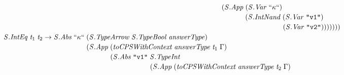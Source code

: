 \documentclass[10pt]{article}
\newcommand{\Conid}[1]{\mathit{#1}}
\newcommand{\Varid}[1]{\mathit{#1}}
\begin{document}
\begin{hscode}
${\hskip1.00em\relax\hskip1.00em\relax\phantom{\Conid{\Conid{S}.IntNand}\;\Varid{t}_{1}\;\Varid{t}_{2}\to \Conid{\Conid{S}.Abs}\;\text{``}\kappa\text{``}\;\mbox{}}\phantom{(\Conid{\Conid{S}.App}\;\mbox{}}\phantom{(\Conid{\Conid{S}.Abs}\;\text{\tt \char34 v1\char34}\;\mbox{}}\phantom{(\Conid{\Conid{S}.App}\;\mbox{}}\phantom{(\Conid{\Conid{S}.Abs}\;\text{\tt \char34 v2\char34}\;\mbox{}}(\Conid{\Conid{S}.App}\;(\Conid{\Conid{S}.Var}\;\text{``}\kappa\text{``})\;}$\\
${\hskip1.00em\relax\hskip1.00em\relax\phantom{\Conid{\Conid{S}.IntNand}\;\Varid{t}_{1}\;\Varid{t}_{2}\to \Conid{\Conid{S}.Abs}\;\text{``}\kappa\text{``}\;\mbox{}}\phantom{(\Conid{\Conid{S}.App}\;\mbox{}}\phantom{(\Conid{\Conid{S}.Abs}\;\text{\tt \char34 v1\char34}\;\mbox{}}\phantom{(\Conid{\Conid{S}.App}\;\mbox{}}\phantom{(\Conid{\Conid{S}.Abs}\;\text{\tt \char34 v2\char34}\;\mbox{}}\phantom{(\Conid{\Conid{S}.App}\;\mbox{}}(\Conid{\Conid{S}.IntNand}\;(\Conid{\Conid{S}.Var}\;\text{\tt \char34 v1\char34})\;}$\\
${\hskip1.00em\relax\hskip1.00em\relax\phantom{\Conid{\Conid{S}.IntNand}\;\Varid{t}_{1}\;\Varid{t}_{2}\to \Conid{\Conid{S}.Abs}\;\text{``}\kappa\text{``}\;\mbox{}}\phantom{(\Conid{\Conid{S}.App}\;\mbox{}}\phantom{(\Conid{\Conid{S}.Abs}\;\text{\tt \char34 v1\char34}\;\mbox{}}\phantom{(\Conid{\Conid{S}.App}\;\mbox{}}\phantom{(\Conid{\Conid{S}.Abs}\;\text{\tt \char34 v2\char34}\;\mbox{}}\phantom{(\Conid{\Conid{S}.App}\;\mbox{}}\phantom{(\Conid{\Conid{S}.IntNand}\;\mbox{}}(\Conid{\Conid{S}.Var}\;\text{\tt \char34 v2\char34})))))))}$\\
${\hskip1.00em\relax\hskip1.00em\relax\Conid{\Conid{S}.IntEq}\;\Varid{t}_{1}\;\Varid{t}_{2}\to \Conid{\Conid{S}.Abs}\;\text{``}\kappa\text{``}\;(\Conid{\Conid{S}.TypeArrow}\;\Conid{\Conid{S}.TypeBool}\;\Varid{answerType})\;}$\\
${\hskip1.00em\relax\hskip1.00em\relax\phantom{\Conid{\Conid{S}.IntEq}\;\Varid{t}_{1}\;\Varid{t}_{2}\to \Conid{\Conid{S}.Abs}\;\text{``}\kappa\text{``}\;\mbox{}}(\Conid{\Conid{S}.App}\;(\Varid{toCPSWithContext}\;\Varid{answerType}\;\Varid{t}_{1}\;\Gamma)\;}$\\
${\hskip1.00em\relax\hskip1.00em\relax\phantom{\Conid{\Conid{S}.IntEq}\;\Varid{t}_{1}\;\Varid{t}_{2}\to \Conid{\Conid{S}.Abs}\;\text{``}\kappa\text{``}\;\mbox{}}\phantom{(\Conid{\Conid{S}.App}\;\mbox{}}(\Conid{\Conid{S}.Abs}\;\text{\tt \char34 v1\char34}\;\Conid{\Conid{S}.TypeInt}\;}$\\
${\hskip1.00em\relax\hskip1.00em\relax\phantom{\Conid{\Conid{S}.IntEq}\;\Varid{t}_{1}\;\Varid{t}_{2}\to \Conid{\Conid{S}.Abs}\;\text{``}\kappa\text{``}\;\mbox{}}\phantom{(\Conid{\Conid{S}.App}\;\mbox{}}\phantom{(\Conid{\Conid{S}.Abs}\;\text{\tt \char34 v1\char34}\;\mbox{}}(\Conid{\Conid{S}.App}\;(\Varid{toCPSWithContext}\;\Varid{answerType}\;\Varid{t}_{2}\;\Gamma)\;}$\\

\end{hscode}
\end{document}
